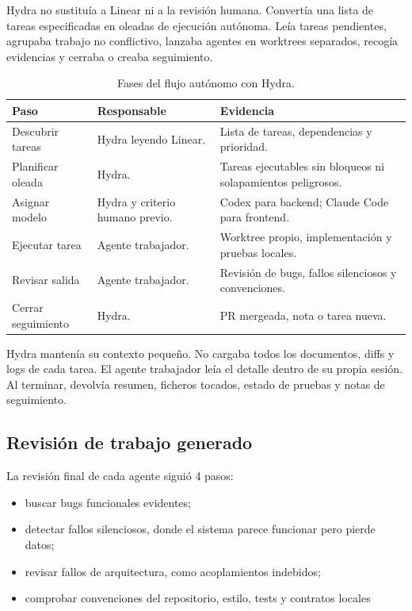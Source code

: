 Hydra no sustituía a Linear ni a la revisión humana. Convertía una lista de
tareas especificadas en oleadas de ejecución autónoma. Leía tareas pendientes,
agrupaba trabajo no conflictivo, lanzaba agentes en worktrees separados,
recogía evidencias y cerraba o creaba seguimiento.

\begin{table}[H]
\begin{center}
\small
\begin{tabular}{|p{3.2cm}|p{4.4cm}|p{4.8cm}|} \hline
\textbf{Paso} & \textbf{Responsable} & \textbf{Evidencia} \\ \hline
Descubrir tareas & Hydra leyendo Linear. & Lista de tareas, dependencias y prioridad. \\ \hline
Planificar oleada & Hydra. & Tareas ejecutables sin bloqueos ni solapamientos peligrosos. \\ \hline
Asignar modelo & Hydra y criterio humano previo. & Codex para backend; Claude Code para frontend. \\ \hline
Ejecutar tarea & Agente trabajador. & Worktree propio, implementación y pruebas locales. \\ \hline
Revisar salida & Agente trabajador. & Revisión de bugs, fallos silenciosos y convenciones. \\ \hline
Cerrar seguimiento & Hydra. & PR mergeada, nota o tarea nueva. \\ \hline
\end{tabular}
\caption{Fases del flujo autónomo con Hydra.}
\end{center}
\end{table}

Hydra mantenía su contexto pequeño. No cargaba todos los documentos, diffs y
logs de cada tarea. El agente trabajador leía el detalle dentro de su propia
sesión. Al terminar, devolvía resumen, ficheros tocados, estado de pruebas y
notas de seguimiento.

\subsection{Revisión de trabajo generado}

La revisión final de cada agente siguió 4 pasos:

\begin{itemize}
\item buscar bugs funcionales evidentes;
\item detectar fallos silenciosos, donde el sistema parece funcionar pero pierde datos;
\item revisar fallos de arquitectura, como acoplamientos indebidos;
\item comprobar convenciones del repositorio, estilo, tests y contratos locales
\end{itemize}

